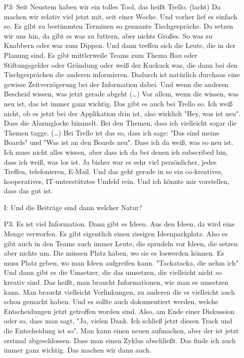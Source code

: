 \begin{itemize}
    \item[P3:] Seit Neustem haben wir ein tolles Tool, das hei{\ss}t Trello. (lacht) Da machen wir relativ viel jetzt mit, seit einer Woche. Und vorher lief es einfach so. Es gibt zu bestimmten Terminen so gennante Tischgespr{\"a}che. Da setzen wir uns hin, da gibt es was zu futtern, aber nichts Gro{\ss}es. So was zu Knabbern oder was zum Dippen. Und dann treffen sich die Leute, die in der Planung sind. Es gibt mittlerweile Teams zum Thema Bau oder Stiftungsgelder oder Gr{\"u}ndung oder wei{\ss} der Kuckuck was, die dann bei den Tischgespr{\"a}chen die anderen informieren. Dadurch ist nat{\"u}rlich durchaus eine gewisse Zeitverz{\"o}gerung bei der Information dabei. Und wenn die anderen Bescheid wissen, was jetzt gerade abgeht (\dots) Vor allem, wenn die wissen, was neu ist, das ist immer ganz wichtig. Das gibt es auch bei Trello so. Ich wei{\ss} nicht, ob es jetzt bei der Applikation drin ist, also wirklich "Hey, was ist neu". Dass die Alarmglocke bimmelt. Bei den Themen, dass ich vielleicht sogar die Themen tagge. (\dots) Bei Trello ist das so, dass ich sage: "Das sind meine Boards" und "Was ist an den Boards neu". Dass ich da wei{\ss}, was so neu ist. Ich muss nicht alles wissen, aber dass ich da bei denen ich subscribed bin, dass ich wei{\ss}, was los ist. Ja bisher war es sehr viel pers{\"o}nlicher, jedes Treffen, telefonieren, E-Mail. Und das geht gerade in so ein co-kreatives, kooperatives, IT-unterst{\"u}tztes Umfeld rein. Und ich k{\"o}nnte mir vorstellen, dass	das gut ist.
    \item[I:] Und die Beitr{\"a}ge sind dann welcher Natur?
    \item[P3:] Es ist viel Information. Dann gibt es Ideen. Aus den Ideen, da wird eine Menge verworfen. Es gibt eigentlich einen riesigen Ideenparkplatz. Also es gibt auch in den Teams auch immer Leute, die sprudeln vor Ideen, die setzen aber nichts um. Die m{\"u}ssen Platz haben, wo sie es loswerden k{\"o}nnen. Es muss Platz geben, wo man Ideen aufgreifen kann. "Tackatacka, die nehm ich" Und dann gibt es die Umsetzer, die das umsetzen, die vielleicht nicht so kreativ sind. Das hei{\ss}t, man braucht Informationen, wie man es umsetzen kann. Man braucht vielleicht Verlinkungen, zu anderen die es vielleicht auch schon gemacht haben. Und es sollte auch dokumentiert werden, welche Entscheidungen jetzt getroffen worden sind. Also, am Ende einer Diskussion oder so, dass man sagt, "Ja, vielen Dank. Ich schlie{\ss} jetzt diesen Track und die Entscheidung ist so". Man kann einen neuen aufmachen, aber der ist jetzt erstmal abgeschlossen. Dass man einen Zyklus abschlie{\ss}t. Das finde ich auch immer ganz wichtig. Das machen wir dann auch.
\end{itemize}

